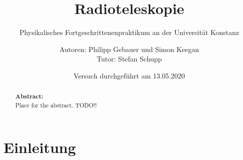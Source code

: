 
 
 \title{Radioteleskopie}
 \subtitle{Physikalisches Fortgeschrittenenpraktikum an der Universität Konstanz}
 \author{Autoren: Philipp Gebauer und Simon Keegan \\ \large{Tutor: Stefan Schupp}}
 \date{Versuch durchgeführt am 13.05.2020}
 \maketitle
 \vspace{2.5 cm}
 \begin{abstract}
     \noindent \textbf{Abstract:}\\
     Place for the abstract. TODO!!
     \vspace{1cm}
     
     \end{abstract}
 \thispagestyle{empty}
 \newpage
 
 \tableofcontents
 \thispagestyle{empty}
 \newpage
 \setcounter{page}{1}    
 
\section{Einleitung}
